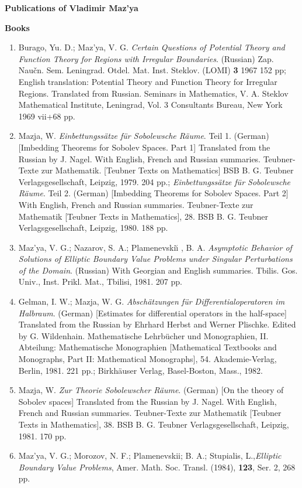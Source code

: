 \documentclass{article}
\begin{document}
\begin{center}

\textbf{\Large Publications of Vladimir Maz'ya}

\end{center}





\textbf{\Large Books}

\begin{enumerate}
\item Burago, Yu. D.; Maz'ya, V. G. {\it Certain Questions of
Potential
Theory and Function Theory for Regions
with Irregular Boundaries}. (Russian) Zap. Nau\v cn. Sem. Leningrad.
Otdel.
Mat. Inst. Steklov. (LOMI) {\bf 3} 1967 152 pp;
English translation:  Potential Theory and Function Theory for
Irregular
Regions. Translated from
Russian. Seminars in Mathematics, V. A. Steklov Mathematical
Institute,
Leningrad, Vol. 3 Consultants Bureau, New York 1969 vii+68 pp.

\item Mazja, W. {\it Einbettungss{\"a}tze f\"ur Sobolewsche
R{\"a}ume}.
Teil 1. (German) [Imbedding Theorems for Sobolev Spaces. Part 1]
Translated
from the Russian by J. Nagel. With English, French and Russian
summaries.
Teubner-Texte zur Mathematik. [Teubner Texts on
Mathematics] BSB B. G. Teubner Verlagsgesellschaft, Leipzig, 1979. 204
pp.;
{\it Einbettungss{\"a}tze f\"ur Sobolewsche R{\"a}ume}.
Teil 2. (German) [Imbedding Theorems for
Sobolev Spaces. Part 2] With English, French and Russian summaries.
Teubner-Texte zur Mathematik [Teubner Texts in Mathematics],
28. BSB B. G. Teubner Verlagsgesellschaft, Leipzig, 1980. 188 pp.

\item Maz'ya, V. G.; Nazarov, S. A.; Plamenevski{\u\i} , B. A. {\it
Asymptotic Behavior of Solutions of
Elliptic Boundary Value Problems under Singular Perturbations of the
Domain}. (Russian) With Georgian and English summaries. Tbilis.
Gos. Univ., Inst. Prikl. Mat., Tbilisi, 1981. 207 pp.

\item Gelman, I. W.; Mazja, W. G. {\it Absch{\"a}tzungen f\"ur
Differentialoperatoren im Halbraum}.
(German) [Estimates for differential operators in the half-space]
Translated from the Russian by Ehrhard Herbst and Werner
Plischke. Edited by G. Wildenhain. Mathematische Lehrb\"ucher und
Monographien, II. Abteilung: Mathematische Monographien
[Mathematical Textbooks and Monographs, Part II: Mathematical
Monographs],
54. Akademie-Verlag, Berlin, 1981. 221 pp.;
Birkh{\"a}user Verlag, Basel-Boston, Mass., 1982.
\item Mazja, W. {\it Zur Theorie Sobolewscher R{\"a}ume}. (German) [On
the
theory of Sobolev spaces] Translated from
the Russian by J. Nagel. With English, French and Russian summaries.
Teubner-Texte zur Mathematik [Teubner Texts in
Mathematics], 38. BSB B. G. Teubner Verlagsgesellschaft, Leipzig,
1981. 170
pp.
\item Maz'ya, V. G.; Morozov, N. F.; Plamenevskii; B. A.; Stupialis,
L.,{\it  Elliptic Boundary Value Problems}, Amer. Math. Soc.
Transl. (1984), {\bf 123}, Ser. 2, 268 pp.


\end{enumerate}
\end{document}

